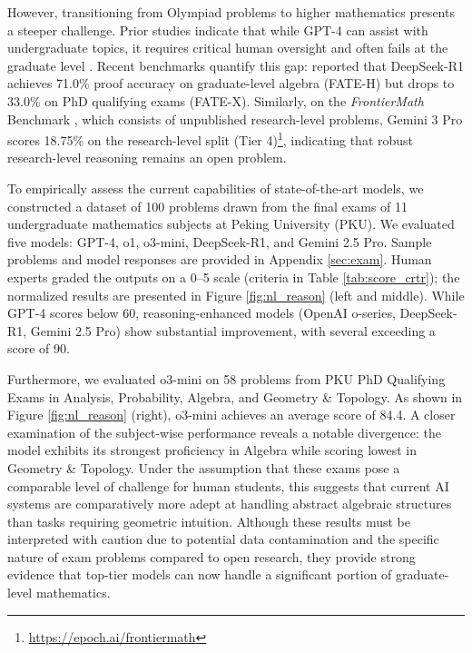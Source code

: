 \documentclass[11pt]{article}
\numberwithin{equation}{section}
\begin{document}
However, transitioning from Olympiad problems to higher mathematics presents a steeper challenge. Prior studies indicate that while GPT-4 can assist with undergraduate topics, it requires critical human oversight \cite{collins2024evaluating} and often fails at the graduate level \cite{NEURIPS2023_58168e8a}. Recent benchmarks quantify this gap: \cite{jiang2025fate} reported that DeepSeek-R1 achieves 71.0\% proof accuracy on graduate-level algebra (FATE-H) but drops to 33.0\% on PhD qualifying exams (FATE-X). Similarly, on the \textit{FrontierMath} Benchmark \cite{glazer2024frontiermath}, which consists of unpublished research-level problems, Gemini 3 Pro scores 18.75\% on the research-level split (Tier 4)\footnote{\href{https://epoch.ai/frontiermath}{https://epoch.ai/frontiermath}}, indicating that robust research-level reasoning remains an open problem.

To empirically assess the current capabilities of state-of-the-art models, we constructed a dataset of 100 problems drawn from the final exams of 11 undergraduate mathematics subjects at Peking University (PKU). We evaluated five models: GPT-4, o1, o3-mini, DeepSeek-R1, and Gemini 2.5 Pro. Sample problems and model responses are provided in Appendix \ref{sec:exam}. Human experts graded the outputs on a 0--5 scale (criteria in Table \ref{tab:score_crtr}); the normalized results are presented in Figure \ref{fig:nl_reason} (left and middle). While GPT-4 scores below 60, reasoning-enhanced models (OpenAI o-series, DeepSeek-R1, Gemini 2.5 Pro) show substantial improvement, with several exceeding a score of 90. 

Furthermore, we evaluated o3-mini on 58 problems from PKU PhD Qualifying Exams in Analysis, Probability, Algebra, and Geometry \& Topology. As shown in Figure \ref{fig:nl_reason} (right), o3-mini achieves an average score of 84.4. A closer examination of the subject-wise performance reveals a notable divergence: the model exhibits its strongest proficiency in Algebra while scoring lowest in Geometry \& Topology. Under the assumption that these exams pose a comparable level of challenge for human students, this suggests that current AI systems are comparatively more adept at handling abstract algebraic structures than tasks requiring geometric intuition. Although these results must be interpreted with caution due to potential data contamination and the specific nature of exam problems compared to open research, they provide strong evidence that top-tier models can now handle a significant portion of graduate-level mathematics.
\end{document}
